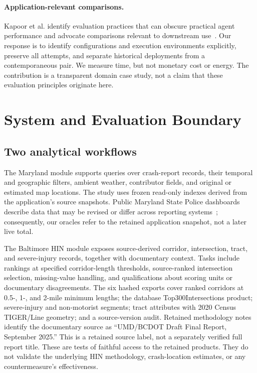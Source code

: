 \documentclass[10pt,twocolumn,letterpaper]{article}
\begin{document}
\paragraph{Application-relevant comparisons.}
Kapoor et al. identify evaluation practices that can obscure practical agent performance and advocate comparisons relevant to downstream use~\cite{agentsmatter}. Our response is to identify configurations and execution environments explicitly, preserve all attempts, and separate historical deployments from a contemporaneous pair. We measure time, but not monetary cost or energy. The contribution is a transparent domain case study, not a claim that these evaluation principles originate here.

\section{System and Evaluation Boundary}
\subsection{Two analytical workflows}
The Maryland module supports queries over crash-report records, their temporal and geographic filters, ambient weather, contributor fields, and original or estimated map locations. The study uses frozen read-only indexes derived from the application's source snapshots. Public Maryland State Police dashboards describe data that may be revised or differ across reporting systems~\cite{mdsp}; consequently, our oracles refer to the retained application snapshot, not a later live total.

The Baltimore HIN module exposes source-derived corridor, intersection, tract, and severe-injury records, together with documentary context. Tasks include rankings at specified corridor-length thresholds, source-ranked intersection selection, missing-value handling, and qualifications about scoring units or documentary disagreements. The six hashed exports cover ranked corridors at 0.5-, 1-, and 2-mile minimum lengths; the database Top300Intersections product; severe-injury and non-motorist segments; tract attributes with 2020 Census TIGER/Line geometry; and a source-version audit. Retained methodology notes identify the documentary source as ``UMD/BCDOT Draft Final Report, September 2025.'' This is a retained source label, not a separately verified full report title. These are tests of faithful access to the retained products. They do not validate the underlying HIN methodology, crash-location estimates, or any countermeasure's effectiveness.
\end{document}
